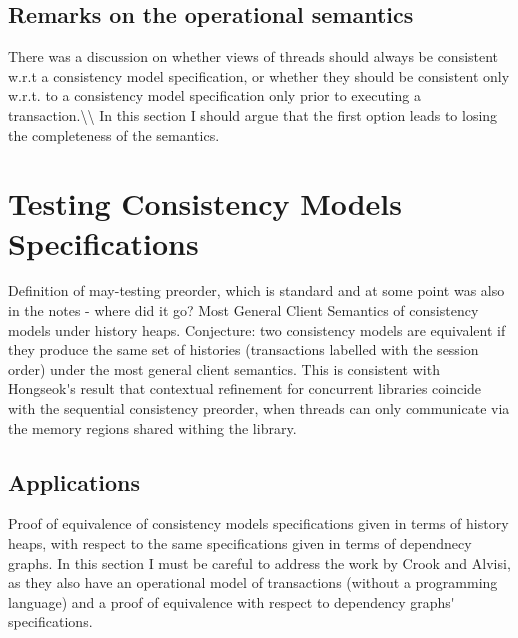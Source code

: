 \documentclass[a4paper,UKenglish]{article}%
\theoremstyle{plain}
\begin{document}
\subsection{Remarks on the operational semantics}
\ac{There was a discussion on whether views of threads should always be consistent w.r.t a 
consistency model specification, or whether they should be consistent only w.r.t. to 
a consistency model specification only prior to executing a transaction.\\ 
In this section I should argue that the first option leads to losing the completeness of the 
semantics.}


\section{Testing Consistency Models Specifications}
\ac{Definition of may-testing preorder, which is standard and at some point 
was also in the notes - where did it go? Most General Client Semantics of consistency 
models under history heaps. Conjecture: two consistency models are equivalent if they 
produce the same set of histories (transactions labelled with the session order) under 
the most general client semantics. This is consistent with Hongseok's result that contextual 
refinement for concurrent libraries coincide with 
the sequential consistency preorder, when threads can only communicate via the memory regions 
shared withing the library.}

\subsection{Applications}
\ac{Proof of equivalence of consistency models specifications given in terms of history heaps, 
with respect to the same specifications given in terms of dependnecy graphs. In this section 
I must be careful to address the work by Crook and Alvisi, as they also have an operational model 
of transactions (without a programming language) and a proof of equivalence with respect to 
dependency graphs' specifications.}
\end{document}
